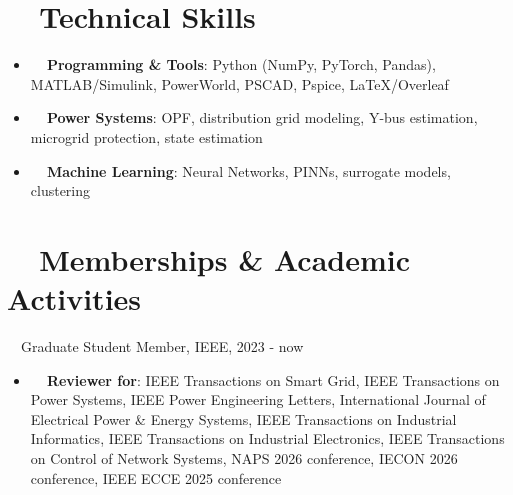 \documentclass[a4paper,8pt]{article}
\newcommand{\resumeItem}[2]{
  \item\small{
    \textbf{#1}{: #2 \vspace{-2pt}}
  }
}
\newcommand{\resumeSubItem}[2]{\resumeItem{#1}{#2}\vspace{-3pt}}
\newcommand{\resumeSubHeadingListStart}{\begin{itemize}[leftmargin=*]}
\newcommand{\resumeSubHeadingListEnd}{\end{itemize}}
\begin{document}

\section{~~Technical Skills}
	\resumeSubHeadingListStart
	\resumeSubItem{~~Programming \& Tools}{Python (NumPy, PyTorch, Pandas), MATLAB/Simulink, PowerWorld, PSCAD, Pspice, LaTeX/Overleaf}
	\resumeSubItem{~~Power Systems}{OPF, distribution grid modeling, Y-bus estimation, microgrid protection, state estimation}
    \resumeSubItem{~~Machine Learning}{Neural Networks, PINNs, surrogate models, clustering}
\resumeSubHeadingListEnd

\vspace{-5pt}
\section{~~Memberships \& Academic Activities}
~~Graduate Student Member, IEEE, 2023 - now\\
\resumeSubHeadingListStart
\resumeSubItem{~~Reviewer for}{IEEE Transactions on Smart Grid, IEEE Transactions on Power Systems, IEEE Power Engineering Letters, International Journal of Electrical Power \& Energy Systems, IEEE Transactions on Industrial Informatics, IEEE Transactions on Industrial Electronics, IEEE Transactions on Control of Network Systems, NAPS 2026 conference, IECON 2026 conference, IEEE ECCE 2025 conference}
\resumeSubHeadingListEnd
\end{document}
